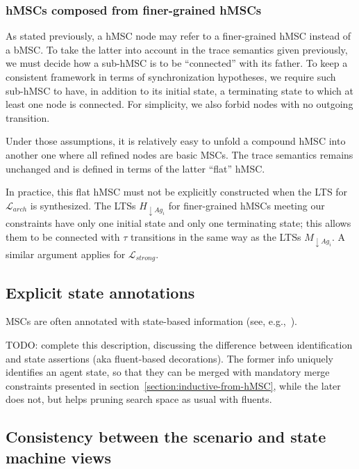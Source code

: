 \subsubsection*{hMSCs composed from finer-grained hMSCs}

As stated previously, a hMSC node may refer to a finer-grained hMSC instead of a bMSC. To take the latter into account in the trace semantics given previously, we must decide how a sub-hMSC is to be ``connected'' with its father. To keep a consistent framework in terms of synchronization hypotheses, we require such sub-hMSC to have, in addition to its initial state, a terminating state to which at least one node is connected. For simplicity, we also forbid nodes with no outgoing transition. 

Under those assumptions, it is relatively easy to unfold a compound hMSC into another one where all refined nodes are basic MSCs. The trace semantics remains unchanged and is defined in terms of the latter ``flat'' hMSC. 

In practice, this flat hMSC must not be explicitly constructed when the LTS for $\mathcal{L}_{arch}$ is synthesized. The LTSs $H_{\downarrow Ag_i}$ for finer-grained hMSCs meeting our constraints have only one initial state and only one terminating state; this allows them to be connected with $\tau$ transitions in the same way as the LTSs $M_{\downarrow Ag_i}$. A similar argument applies for $\mathcal{L}_{strong}$.

\subsection{Explicit state annotations\label{subsection:background-scenario-annotations}}

MSCs are often annotated with state-based information (see, e.g.,~\cite{VanLamsweerde:1998, Kruger:2000, Whittle:2000}). 

TODO: complete this description, discussing the difference between identification and state assertions (aka fluent-based decorations). The former info uniquely identifies an agent state, so that they can be merged with mandatory merge constraints presented in section~\ref{section:inductive-from-hMSC}, while the later does not, but helps pruning search space as usual with fluents.

\subsection{Consistency between the scenario and state machine views\label{subsection:background-scenario-consistency}}

